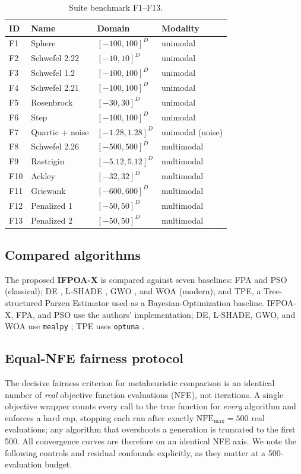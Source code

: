 \documentclass[preprint,12pt]{elsarticle}
\begin{document}
\begin{table}[htbp]
\centering
\caption{Suite benchmark F1--F13.}
\label{tab:suite}
\begin{tabular}{llll}
\hline
ID & Name & Domain & Modality \\
\hline
F1 & Sphere & $[-100, 100]^D$ & unimodal \\
F2 & Schwefel 2.22 & $[-10, 10]^D$ & unimodal \\
F3 & Schwefel 1.2 & $[-100, 100]^D$ & unimodal \\
F4 & Schwefel 2.21 & $[-100, 100]^D$ & unimodal \\
F5 & Rosenbrock & $[-30, 30]^D$ & unimodal \\
F6 & Step & $[-100, 100]^D$ & unimodal \\
F7 & Quartic + noise & $[-1.28, 1.28]^D$ & unimodal (noise) \\
F8 & Schwefel 2.26 & $[-500, 500]^D$ & multimodal \\
F9 & Rastrigin & $[-5.12, 5.12]^D$ & multimodal \\
F10 & Ackley & $[-32, 32]^D$ & multimodal \\
F11 & Griewank & $[-600, 600]^D$ & multimodal \\
F12 & Penalized 1 & $[-50, 50]^D$ & multimodal \\
F13 & Penalized 2 & $[-50, 50]^D$ & multimodal \\
\hline
\end{tabular}
\end{table}

\subsection{Compared algorithms}
\label{subsec4-2}
The proposed \textbf{IFPOA-X} is compared against seven baselines: FPA \cite{yang2012flower} and PSO \cite{kennedy1995particle} (classical); DE \cite{storn1997differential}, L-SHADE \cite{tanabe2014improving}, GWO \cite{mirjalili2014grey}, and WOA \cite{mirjalili2016whale} (modern); and TPE, a Tree-structured Parzen Estimator \cite{bergstra2013hyperopt} used as a Bayesian-Optimization baseline. IFPOA-X, FPA, and PSO use the authors' implementation; DE, L-SHADE, GWO, and WOA use \texttt{mealpy} \cite{vanthieu2023mealpy}; TPE uses \texttt{optuna} \cite{akiba2019optuna}.

\subsection{Equal-NFE fairness protocol}
\label{subsec4-3}
The decisive fairness criterion for metaheuristic comparison is an identical number of \emph{real} objective function evaluations (NFE), not iterations. A single objective wrapper counts every call to the true function for \emph{every} algorithm and enforces a hard cap, stopping each run after exactly $\mathrm{NFE}_{\max} = 500$ real evaluations; any algorithm that overshoots a generation is truncated to the first 500. All convergence curves are therefore on an identical NFE axis. We note the following controls and residual confounds explicitly, as they matter at a 500-evaluation budget.
\end{document}
